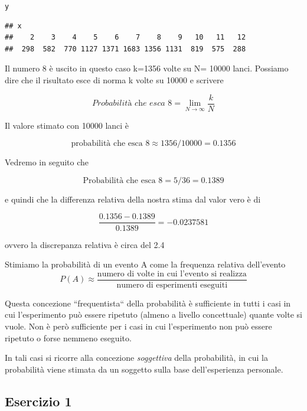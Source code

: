 \documentclass[onecolumn,12pt]{book}\usepackage[]{graphicx}\usepackage[]{color}
\makeatletter
\newcommand{\hlstd}[1]{\textcolor[rgb]{0.345,0.345,0.345}{#1}}%
\newenvironment{kframe}{%
 \def\at@end@of@kframe{}%
 \ifinner\ifhmode%
  \def\at@end@of@kframe{\end{minipage}}%
  \begin{minipage}{\columnwidth}%
 \fi\fi%
 \def\FrameCommand##1{\hskip\@totalleftmargin \hskip-\fboxsep
 \colorbox{shadecolor}{##1}\hskip-\fboxsep
     \hskip-\linewidth \hskip-\@totalleftmargin \hskip\columnwidth}%
 \MakeFramed {\advance\hsize-\width
   \@totalleftmargin\z@ \linewidth\hsize
   \@setminipage}}%
 {\par\unskip\endMakeFramed%
 \at@end@of@kframe}
\newenvironment{knitrout}{}{} %
\makeatother
\begin{document}
 

\begin{knitrout}
\color{fgcolor}\begin{kframe}
\begin{alltt}
\hlstd{y}
\end{alltt}
\begin{verbatim}
## x
##    2    3    4    5    6    7    8    9   10   11   12 
##  298  582  770 1127 1371 1683 1356 1131  819  575  288
\end{verbatim}
\end{kframe}
\end{knitrout}
Il numero 8 è uscito in questo caso k=1356 volte su N= 10000 lanci.  
Possiamo dire che il risultato esce di norma k  volte su 10000 e scrivere 

$$\textit{Probabilità che esca 8}=\lim_{N\to \infty}\dfrac{k}{N}$$
 
Il valore stimato con 10000 lanci è

$$\textrm{probabilità che esca 8} \approx 1356/10000 = 0.1356$$

 


Vedremo in seguito che

$$\textrm{Probabilità che esca 8} = 5/36=0.1389 $$

e quindi che la differenza relativa della nostra stima dal valor vero è di 

$$\dfrac{0.1356 -0.1389}{0.1389}=\ensuremath{-0.0237581}$$

ovvero la discrepanza relativa è circa del 2.4%

Stimiamo la probabilità di un evento A come la frequenza relativa dell'evento
$$P(A)\approx \dfrac{\textrm{numero di volte in cui l'evento si realizza}}{\textrm{numero di esperimenti 
eseguiti}}$$

 

Questa concezione ``frequentista`` della probabilità è sufficiente in tutti i casi in cui l'esperimento può essere ripetuto  (almeno a livello concettuale) quante volte si vuole.
Non è però sufficiente per i casi in cui l'esperimento non può essere ripetuto o forse nemmeno eseguito. 

 In tali casi si ricorre alla concezione \emph{soggettiva} della probabilità, in cui la probabilità viene stimata da un soggetto sulla base dell'esperienza personale. 


\subsection{Esercizio 1 }
\end{document}
